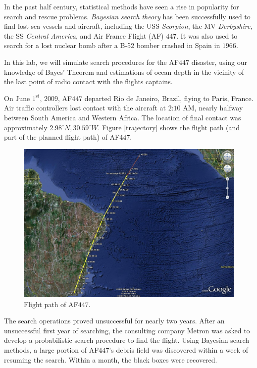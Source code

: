 

In the past half century, statistical methods have seen a rise in popularity for search and rescue problems. \emph{Bayesian search theory} has been successfully used to find lost sea vessels and aircraft, including the USS \emph{Scorpion}, the MV \emph{Derbyshire}, the SS \emph{Central America}, and Air France Flight (AF) $447$. It was also used to search for a lost nuclear bomb after a B-52 bomber crashed in Spain in $1966$.

In this lab, we will simulate search procedures for the AF$447$ disaster, using our knowledge of Bayes' Theorem and estimations of ocean depth in the vicinity of the last point of radio contact with the flights captains.

On June $1^{\text{st}}$, $2009$, AF$447$ departed Rio de Janeiro, Brazil, flying to Paris, France. Air traffic controllers lost contact with the aircraft at $2$:$10$ AM, nearly halfway between South America and Western Africa. The location of final contact was approximately $2.98^{\circ} N, 30.59^{\circ} W$. Figure \ref{trajectory} shows the flight path (and part of the planned flight path) of AF$447$.

\begin{figure}[h]
\centering
\includegraphics[width=\textwidth]{trajectory.jpg}
\caption{Flight path of AF$447$.}
\end{figure}

The search operations proved unsuccessful for nearly two years. After an unsuccessful first year of searching, the consulting company Metron was asked to develop a probabilistic search procedure to find the flight. Using Bayesian search methods, a large portion of AF$447$'s debris field was discovered within a week of resuming the search. Within a month, the black boxes were recovered.


